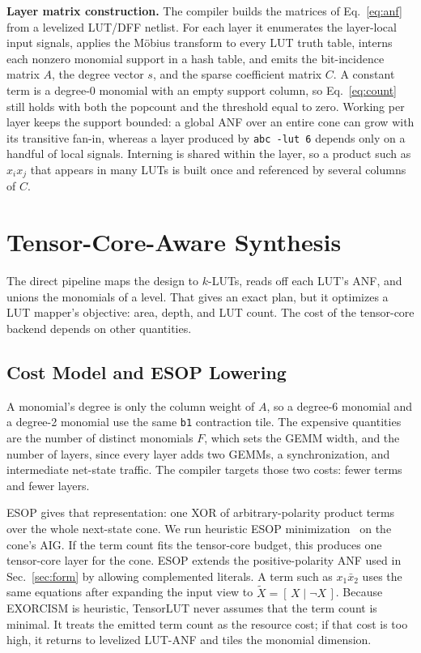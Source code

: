 \documentclass[sigconf]{acmart}
\begin{document}
\textbf{Layer matrix construction.} The compiler builds the matrices of Eq.~\eqref{eq:anf} from a
levelized LUT/DFF netlist. For each layer it enumerates the layer-local input signals, applies the
M\"obius transform to every LUT truth table, interns each nonzero monomial support in a hash table,
and emits the bit-incidence matrix $A$, the degree vector $s$, and the sparse coefficient matrix
$C$. A constant term is a degree-0 monomial with an empty support column, so Eq.~\eqref{eq:count}
still holds with both the popcount and the threshold equal to zero. Working per layer keeps the
support bounded: a global ANF over an entire cone can grow with its transitive fan-in, whereas a
layer produced by \texttt{abc -lut 6} depends only on a handful of local signals. Interning is
shared within the layer, so a product such as $x_i x_j$ that appears in many LUTs is built once and
referenced by several columns of $C$.

\section{Tensor-Core-Aware Synthesis}\label{sec:compiler}
The direct pipeline maps the design to $k$-LUTs, reads off each LUT's ANF, and unions the
monomials of a level. That gives an exact plan, but it optimizes a LUT mapper's objective: area,
depth, and LUT count. The cost of the tensor-core backend depends on other quantities.

\subsection{Cost Model and ESOP Lowering}
A monomial's degree is only the column weight of $A$, so a degree-6 monomial and a degree-2 monomial
use the same \texttt{b1} contraction tile. The expensive quantities are the number of distinct
monomials $F$, which sets the GEMM width, and the number of layers, since every layer adds two
GEMMs, a synchronization, and intermediate net-state traffic. The compiler targets those two
costs: fewer terms and fewer layers.

ESOP gives that representation: one XOR of arbitrary-polarity product terms over the whole
next-state cone. We run heuristic ESOP minimization~\cite{exorcism} on the cone's AIG. If the term
count fits the tensor-core budget, this produces one tensor-core layer for the cone. ESOP extends
the positive-polarity ANF used in Sec.~\ref{sec:form} by allowing complemented literals. A term
such as $x_1\bar{x}_2$ uses the same equations after expanding the input view to
$\tilde X=[\,X\mid \lnot X\,]$. Because EXORCISM is heuristic, TensorLUT never assumes that the
term count is minimal. It treats the emitted term count as the resource cost; if that cost is too
high, it returns to levelized LUT-ANF and tiles the monomial dimension.
\end{document}
